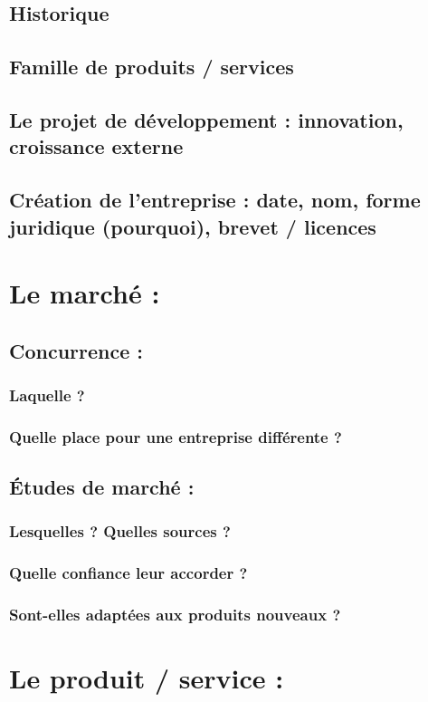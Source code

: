 	\subsection{Historique}
	\subsection{Famille de produits / services}
	\subsection{Le projet de développement : innovation, croissance externe}
	\subsection{Création de l'entreprise : date, nom, forme juridique (pourquoi), brevet  / licences}

\section{Le marché :}
	\subsection{Concurrence :}
		\subsubsection{Laquelle ?}
		\subsubsection{Quelle place pour une entreprise différente ?}
	\subsection{Études de marché :}
		\subsubsection{Lesquelles ? Quelles sources ?}
		\subsubsection{Quelle confiance leur accorder ?}
		\subsubsection{Sont-elles adaptées aux produits nouveaux ?}

\section{Le produit / service :}
